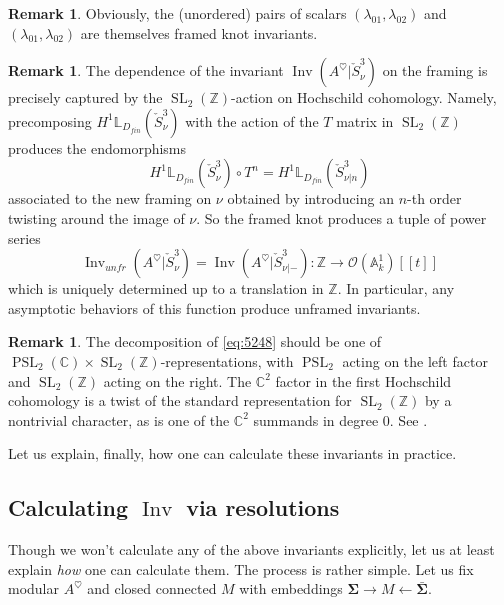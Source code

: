 \documentclass[reqno]{amsart}
\theoremstyle{definition}
\newtheorem{remark}[lemma]{Remark}
\newcommand{\mbb}[1]{\mathbb{#1}}
\newcommand{\mcl}[1]{\mathcal{#1}}
\newcommand{\mbf}[1]{\mathbf{#1}}
\newcommand{\opn}[1]{\operatorname{#1}}
\renewcommand{\1}{\mathbf{1}}
\begin{document}
\begin{remark}
Obviously, the (unordered) pairs of scalars $(\lambda_{01},\lambda_{02})$ and $(\lambda_{01},\lambda_{02})$ are themselves framed knot invariants.
\end{remark}

\begin{remark}
The dependence of the invariant $\opn{Inv}(A^{\heartsuit}|\check{S}^3_{\nu})$ on the framing is precisely captured by the $\opn{SL}_2(\mbb{Z})$-action on Hochschild cohomology. Namely, precomposing $H^1\mbb{L}_{D_{fin}}(\check{S}^3_{\nu})$ with the action of the $T$ matrix in $\opn{SL}_2(\mbb{Z})$ produces the endomorphisms
\[
H^1\mbb{L}_{D_{fin}}(\check{S}^3_{\nu})\circ T^n=H^1\mbb{L}_{D_{fin}}(\check{S}^3_{\nu|n})
\]
associated to the new framing on $\nu$ obtained by introducing an $n$-th order twisting around the image of $\nu$. So the framed knot produces a tuple of power series
\[
\opn{Inv}_{unfr}(A^{\heartsuit}|\check{S}^3_{\nu})=\opn{Inv}(A^{\heartsuit}|\check{S}^3_{\nu|-}):\mbb{Z}\to \mcl{O}(\mbb{A}^1_k)[\![t]\!]
\]
which is uniquely determined up to a translation in $\mbb{Z}$. In particular, any asymptotic behaviors of this function produce unframed invariants.
\end{remark}

\begin{remark}
The decomposition of \eqref{eq:5248} should be one of $\opn{PSL}_2(\mbb{C})\times \opn{SL}_2(\mbb{Z})$-representations, with $\opn{PSL}_2$ acting on the left factor and $\opn{SL}_2(\mbb{Z})$ acting on the right. The $\mbb{C}^2$ factor in the first Hochschild cohomology is a twist of the standard representation for $\opn{SL}_2(\mbb{Z})$ by a nontrivial character, as is one of the $\mbb{C}^2$ summands in degree $0$. See \cite{lachowskaqi21}.
\end{remark}

Let us explain, finally, how one can calculate these invariants in practice.

\subsection{Calculating $\opn{Inv}$ via resolutions}
\label{sect:calc_3mfld}

Though we won't calculate any of the above invariants explicitly, let us at least explain \emph{how} one can calculate them.  The process is rather simple.  Let us fix modular $A^{\heartsuit}$ and closed connected $M$ with embeddings $\mbf{\Sigma}\to M\leftarrow \bar{\mbf{\Sigma}}$.
\par
\end{document}
